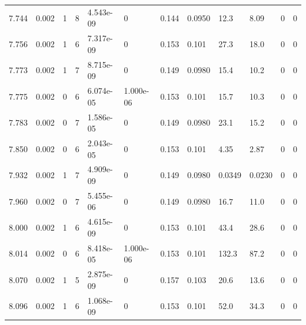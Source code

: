 \documentclass[preview]{standalone}
\begin{document}
{{{{{{{\begin{tabular}{L{1.2cm}C{1.2cm} C{0.3cm}C{0.5cm} C{1.4cm}C{1.4cm} C{1.4cm}C{1.4cm} C{1.6cm}C{1.6cm} C{1.6cm}C{1.6cm}}
  7.744  &  0.002  & 1     &  8 &  4.543e-09  & 0  &  0.144&   0.0950& 12.3 & 8.09   &  0 & 0  \\ 
  7.756  &  0.002  & 1     &  6 &  7.317e-09  & 0  &  0.153&   0.101& 27.3 & 18.0   &  0 & 0  \\ 
  7.773  &  0.002  & 1     &  7 &  8.715e-09  & 0  &  0.149&   0.0980& 15.4 & 10.2   &  0 & 0  \\ 
  7.775  &  0.002  & 0     &  6 &  6.074e-05  & 1.000e-06  &  0.153&   0.101& 15.7 & 10.3   &  0 & 0  \\ 
  7.783  &  0.002  & 0     &  7 &  1.586e-05  & 0  &  0.149&   0.0980& 23.1 & 15.2   &  0 & 0  \\ 
  7.850  &  0.002  & 0     &  6 &  2.043e-05  & 0  &  0.153&   0.101& 4.35 & 2.87   &  0 & 0  \\ 
  7.932  &  0.002  & 1     &  7 &  4.909e-09  & 0  &  0.149&   0.0980& 0.0349 & 0.0230   &  0 & 0  \\ 
  7.960  &  0.002  & 0     &  7 &  5.455e-06  & 0  &  0.149&   0.0980& 16.7 & 11.0   &  0 & 0  \\ 
  8.000  &  0.002  & 1     &  6 &  4.615e-09  & 0  &  0.153&   0.101& 43.4 & 28.6   &  0 & 0  \\ 
  8.014  &  0.002  & 0     &  6 &  8.418e-05  & 1.000e-06  &  0.153&   0.101& 132.3 & 87.2   &  0 & 0  \\ 
  8.070  &  0.002  & 1     &  5 &  2.875e-09  & 0  &  0.157&   0.103& 20.6 & 13.6   &  0 & 0  \\ 
  8.096  &  0.002  & 1     &  6 &  1.068e-09  & 0  &  0.153&   0.101& 52.0 & 34.3   &  0 & 0  \\ 
\hline 
\end{tabular} 

}}}}}}}
\end{document}
